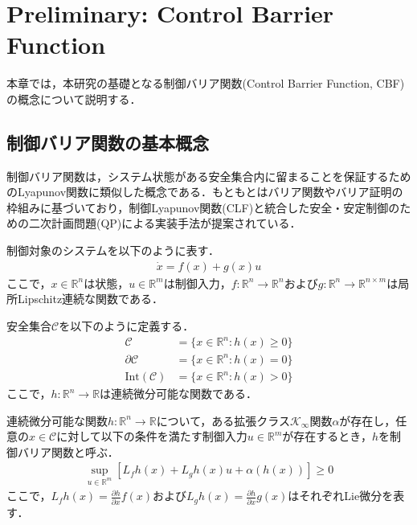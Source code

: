 \section{Preliminary: Control Barrier Function}

本章では，本研究の基礎となる制御バリア関数(Control Barrier Function, CBF)の概念について説明する．

\subsection{制御バリア関数の基本概念}

制御バリア関数は，システム状態がある安全集合内に留まることを保証するためのLyapunov関数に類似した概念である．もともとはバリア関数やバリア証明の枠組みに基づいており，制御Lyapunov関数(CLF)と統合した安全・安定制御のための二次計画問題(QP)による実装手法が提案されている\cite{Ames2017}．

制御対象のシステムを以下のように表す．
\begin{equation}
\begin{aligned}
\dot{x} = f(x) + g(x)u
\label{eq:system}
\end{aligned}
\end{equation}
ここで，$x \in \mathbb{R}^n$は状態，$u \in \mathbb{R}^m$は制御入力，$f: \mathbb{R}^n \rightarrow \mathbb{R}^n$および$g: \mathbb{R}^n \rightarrow \mathbb{R}^{n \times m}$は局所Lipschitz連続な関数である．

安全集合$\mathcal{C}$を以下のように定義する．
\begin{equation}
\begin{aligned}
\mathcal{C} &= \{x \in \mathbb{R}^n : h(x) \geq 0\} \\
\partial\mathcal{C} &= \{x \in \mathbb{R}^n : h(x) = 0\} \\
\text{Int}(\mathcal{C}) &= \{x \in \mathbb{R}^n : h(x) > 0\}
\label{eq:safe_set}
\end{aligned}
\end{equation}
ここで，$h: \mathbb{R}^n \rightarrow \mathbb{R}$は連続微分可能な関数である．

\begin{definition}[制御バリア関数]
連続微分可能な関数$h: \mathbb{R}^n \rightarrow \mathbb{R}$について，ある拡張クラス$\mathcal{K}_{\infty}$関数$\alpha$が存在し，任意の$x \in \mathcal{C}$に対して以下の条件を満たす制御入力$u \in \mathbb{R}^m$が存在するとき，$h$を制御バリア関数と呼ぶ．
\begin{equation}
\begin{aligned}
\sup_{u \in \mathbb{R}^m} [L_f h(x) + L_g h(x)u + \alpha(h(x))] \geq 0
\label{eq:cbf_condition}
\end{aligned}
\end{equation}
ここで，$L_f h(x) = \frac{\partial h}{\partial x}f(x)$および$L_g h(x) = \frac{\partial h}{\partial x}g(x)$はそれぞれLie微分を表す．
\end{definition}

